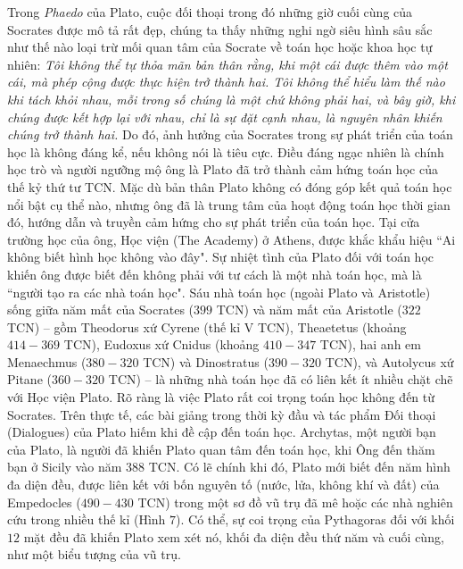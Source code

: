 	\begin{multicols}{2}
		Trong \textit{Phaedo} của Plato, cuộc đối thoại trong đó những giờ cuối cùng của Socrates được mô tả rất đẹp, chúng ta thấy những nghi ngờ siêu hình sâu sắc như thế nào loại trừ mối quan tâm của Socrate về toán học hoặc khoa học tự nhiên:
		\vskip 0.1cm
		\textit{Tôi không thể tự thỏa mãn bản thân rằng, khi một cái được thêm vào một cái, mà phép cộng được thực hiện trở thành hai. 
			\vskip 0.1cm
			Tôi không thể hiểu làm thế nào khi tách khỏi nhau, mỗi trong số chúng là một chứ không phải hai, và bây giờ, khi chúng được kết hợp lại với nhau, chỉ là sự đặt cạnh nhau, là nguyên nhân khiến chúng trở thành hai.}
		\vskip 0.1cm
		Do đó, ảnh hưởng của Socrates trong sự phát triển của toán học là không đáng kể, nếu không nói là tiêu cực. Điều đáng ngạc nhiên là chính học trò và người ngưỡng mộ ông là Plato đã trở thành cảm hứng toán học của thế kỷ thứ tư TCN. 
		\vskip 0.1cm
		Mặc dù bản thân Plato không có đóng góp kết quả toán học nổi bật cụ thể nào, nhưng ông đã là trung tâm của hoạt động toán học thời gian đó, hướng dẫn và truyền cảm hứng cho sự phát triển của toán học. Tại cửa trường học của ông, Học viện (The Academy) ở Athens, được khắc khẩu hiệu ``Ai không biết hình học không vào đây".
		\vskip 0.1cm
		\vskip 0.1cm
		Sự nhiệt tình của Plato đối với toán học khiến ông được biết đến không phải với tư cách là một nhà toán học, mà là ``người tạo ra các nhà toán học".
		\vskip 0.1cm
		Sáu nhà toán học (ngoài Plato và Aristotle) sống giữa năm mất của Socrates ($399$ TCN) và năm mất của Aristotle ($322$ TCN) -- gồm Theodorus xứ Cyrene (thế kỉ V TCN), Theaetetus (khoảng $414-369$ TCN), Eudoxus xứ Cnidus (khoảng $410-347$ TCN), hai anh em Menaechmus ($380-320$ TCN) và Dinostratus ($390-320$  TCN), và Autolycus xứ Pitane ($360-320$ TCN) -- là những nhà toán học đã có liên kết ít nhiều chặt chẽ với Học viện Plato.
		\vskip 0.1cm
		Rõ ràng là việc Plato rất coi trọng toán học không đến từ Socrates. Trên thực tế, các bài giảng trong thời kỳ đầu và tác phẩm Đối thoại (Dialogues) của Plato hiếm khi đề cập đến toán học. Archytas, một người bạn của Plato, là người đã khiến Plato quan tâm đến toán học, khi Ông đến thăm bạn ở Sicily vào năm $388$ TCN. Có lẽ chính khi đó, Plato mới biết đến năm hình đa diện đều, được liên kết với bốn nguyên tố (nước, lửa, không khí và đất) của Empedocles ($490-430$ TCN) trong một sơ đồ vũ trụ đã mê hoặc các nhà nghiên cứu trong nhiều thế kỉ (Hình $7$). 
		\vskip 0.1cm
		Có thể, sự coi trọng của Pythagoras đối với khối $12$ mặt đều đã khiến Plato xem xét nó, khối đa diện đều thứ năm và cuối cùng, như một biểu tượng của vũ trụ. 

\end{multicols}
